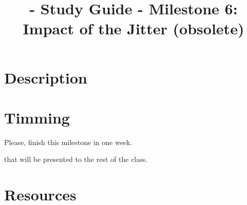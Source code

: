 
\title{\TM{} - Study Guide - Milestone 6: Impact of the Jitter (obsolete)}

\maketitle

\section{Description}



\section{Timming}

Please, finish this milestone in one week.

 that
will be presented to the rest of the class.

\section{Resources}


